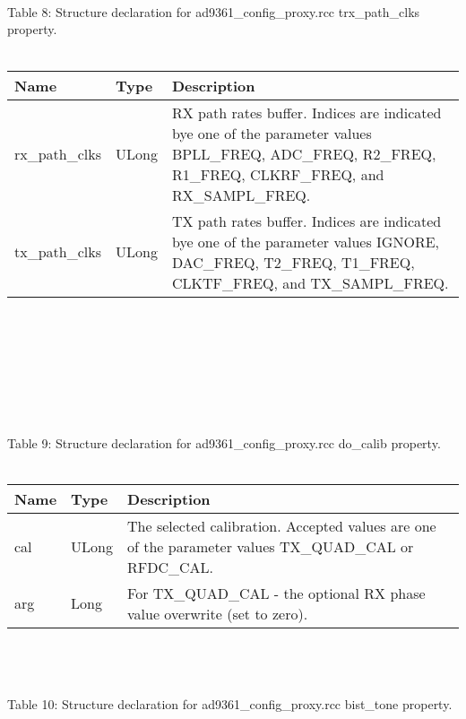 \documentclass{article}
\def\comp{ad9361\_config\_proxy}
\begin{document}
\begin{landscape}
\begin{scriptsize}
	\end{scriptsize}\\ \\ \\
	Table \hypertarget{tab8}{8}: Structure declaration for \comp{}.rcc trx\_path\_clks property.\\ \\
		\begin{scriptsize}
		\begin{tabular}{|p{4.7cm}|p{2.7cm}|p{13.77cm}|} \hline \cellcolor{blue} Name & \cellcolor{blue}Type & \cellcolor{blue}Description \\ \hline rx\_path\_clks & ULong & RX path rates buffer. Indices are indicated bye one of the parameter values BPLL\_FREQ, ADC\_FREQ, R2\_FREQ, R1\_FREQ, CLKRF\_FREQ, and RX\_SAMPL\_FREQ.\\ \hline tx\_path\_clks & ULong & TX path rates buffer. Indices are indicated bye one of the parameter values IGNORE,    DAC\_FREQ, T2\_FREQ, T1\_FREQ, CLKTF\_FREQ, and TX\_SAMPL\_FREQ.\\ \hline \end{tabular}
	\end{scriptsize}\\ \\ \\ \\ \\ \\ \\
	Table \hypertarget{tab9}{9}: Structure declaration for \comp{}.rcc do\_calib property.\\ \\
		\begin{scriptsize}
		\begin{tabular}{|p{4.7cm}|p{2.7cm}|p{13.77cm}|} \hline \cellcolor{blue} Name & \cellcolor{blue}Type & \cellcolor{blue}Description \\ \hline cal & ULong & The selected calibration. Accepted values are one of the parameter values TX\_QUAD\_CAL or RFDC\_CAL. \\ \hline arg & Long & For TX\_QUAD\_CAL - the optional RX phase value overwrite (set to zero).\\ \hline \end{tabular}
	\end{scriptsize}\\ \\ \\
	Table \hypertarget{tab10}{10}: Structure declaration for \comp{}.rcc bist\_tone property.\\ \\

\end{landscape}
\end{document}
